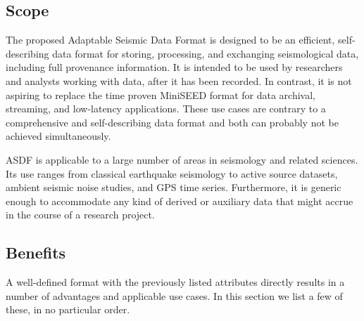 \subsection{Scope}

The proposed Adaptable Seismic Data Format is designed to be an efficient,
self-describing data format for storing, processing, and exchanging
seismological data, including full provenance information.
It is intended to be used by researchers and analysts working with data, after
it has been recorded.
In contrast, it is not aspiring to replace the time proven MiniSEED format for
data archival, streaming, and low-latency applications. These use cases are
contrary to a comprehensive and self-describing data format and both can
probably not be achieved simultaneously.

ASDF is applicable to a large number of areas in seismology and
related sciences. Its use ranges from classical earthquake seismology to active
source datasets, ambient seismic noise studies, and GPS time series.
Furthermore, it is generic enough to accommodate any kind of derived or
auxiliary data that might accrue in the course of a research project.

\subsection{Benefits}

A well-defined format with the previously listed attributes directly results in
a number of advantages and applicable use cases. In this section we list a few
of these, in no particular order.


